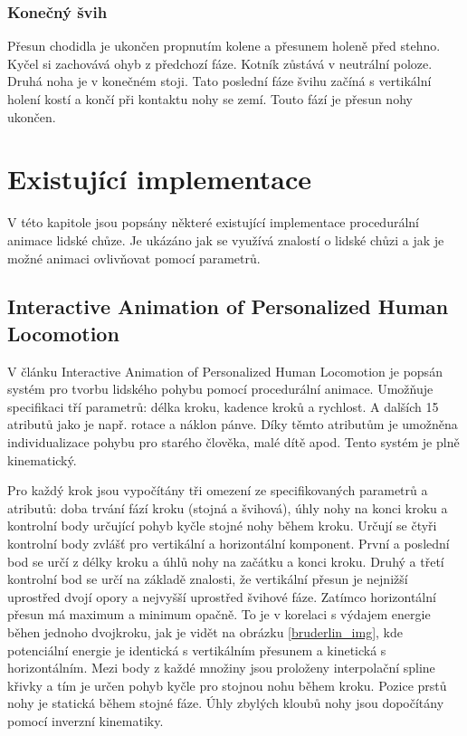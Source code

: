\subsection{Konečný švih}
Přesun chodidla je ukončen propnutím kolene a přesunem holeně před stehno. Kyčel si zachovává ohyb z předchozí fáze. Kotník zůstává v neutrální poloze. Druhá noha je v konečném stoji. Tato poslední fáze švihu začíná s vertikální holení kostí a končí při kontaktu nohy se zemí. Touto fází je přesun nohy ukončen.

\chapter{Existující implementace}
V této kapitole jsou popsány některé existující implementace procedurální animace lidské chůze. Je ukázáno jak se využívá znalostí o lidské chůzi a jak je možné animaci ovlivňovat pomocí parametrů.
\section{Interactive Animation of Personalized Human Locomotion}
V článku Interactive Animation of Personalized Human Locomotion \cite{bruderlin} je popsán systém pro tvorbu lidského pohybu pomocí procedurální animace. Umožňuje specifikaci tří parametrů: délka kroku, kadence kroků a rychlost. A dalších 15 atributů jako je např. rotace a náklon pánve. Díky těmto atributům je umožněna individualizace pohybu pro starého člověka, malé dítě apod. Tento systém je plně kinematický. 

Pro každý krok jsou vypočítány tři omezení ze specifikovaných parametrů a atributů: doba trvání fází kroku (stojná a švihová), úhly nohy na konci kroku a kontrolní body určující pohyb kyčle stojné nohy během kroku. Určují se čtyři kontrolní body zvlášť pro vertikální a horizontální komponent. První a  poslední bod se určí z délky kroku a úhlů nohy na začátku a konci kroku. Druhý a třetí kontrolní bod se určí na základě znalosti, že vertikální přesun je nejnižší uprostřed dvojí opory a nejvyšší uprostřed švihové fáze. Zatímco horizontální přesun má maximum a minimum opačně. To je v korelaci s výdajem energie běhen jednoho dvojkroku, jak je vidět na obrázku \ref{bruderlin_img}, kde potenciální energie je identická s vertikálním přesunem a kinetická s horizontálním. Mezi body z každé množiny jsou proloženy interpolační spline křivky a tím je určen pohyb kyčle pro stojnou nohu během kroku. Pozice prstů nohy je statická během stojné fáze. Úhly zbylých kloubů nohy jsou dopočítány pomocí inverzní kinematiky.

